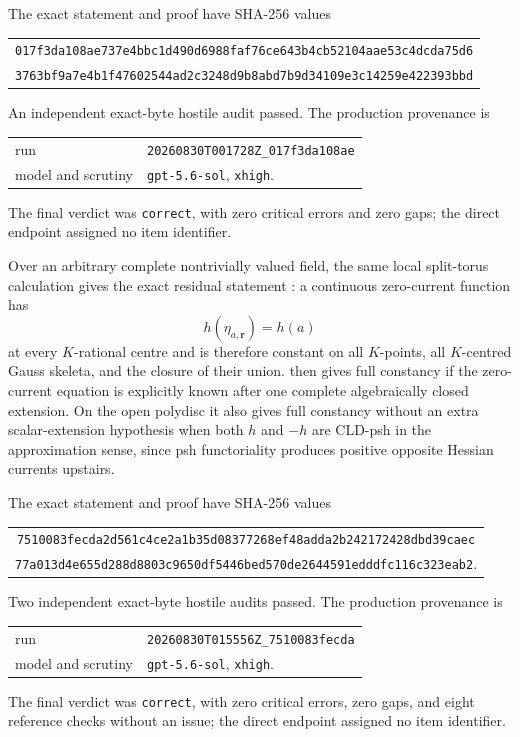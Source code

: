 The exact statement and proof have SHA-256 values
\begin{center}
\small
\begin{tabular}{@{}c@{}}
\nolinkurl{017f3da108ae737e4bbc1d490d6988faf76ce643b4cb52104aae53c4dcda75d6}\\
\nolinkurl{3763bf9a7e4b1f47602544ad2c3248d9b8abd7b9d34109e3c14259e422393bbd}
\end{tabular}
\end{center}
An independent exact-byte hostile audit passed.  The production provenance
is
\begin{center}
\small
\begin{tabular}{@{}ll@{}}
run & \nolinkurl{20260830T001728Z_017f3da108ae}\\
model and scrutiny & \texttt{gpt-5.6-sol}, \texttt{xhigh}.
\end{tabular}
\end{center}
The final verdict was \texttt{correct}, with zero critical errors and zero
gaps; the direct endpoint assigned no item identifier.

Over an arbitrary complete nontrivially valued field, the same local
split-torus calculation gives the exact residual statement
: a continuous zero-current function
has
\[
                         h(\eta_{a,\mathbf r})=h(a)
\]
at every \(K\)-rational centre and is therefore constant on all
\(K\)-points, all \(K\)-centred Gauss skeleta, and the closure of their
union.   then gives full constancy if
the zero-current equation is explicitly known after one complete
algebraically closed extension.  On the open polydisc it also gives full
constancy without an extra scalar-extension hypothesis when both \(h\) and
\(-h\) are CLD-psh in the approximation sense, since psh functoriality
produces positive opposite Hessian currents upstairs.

The exact statement and proof have SHA-256 values
\begin{center}
\small
\begin{tabular}{@{}c@{}}
\nolinkurl{7510083fecda2d561c4ce2a1b35d08377268ef48adda2b242172428dbd39caec}\\
\nolinkurl{77a013d4e655d288d8803c9650df5446bed570de2644591edddfc116c323eab2}.
\end{tabular}
\end{center}
Two independent exact-byte hostile audits passed.  The production provenance
is
\begin{center}
\small
\begin{tabular}{@{}ll@{}}
run & \nolinkurl{20260830T015556Z_7510083fecda}\\
model and scrutiny & \texttt{gpt-5.6-sol}, \texttt{xhigh}.
\end{tabular}
\end{center}
The final verdict was \texttt{correct}, with zero critical errors, zero gaps,
and eight reference checks without an issue; the direct endpoint assigned no
item identifier.

